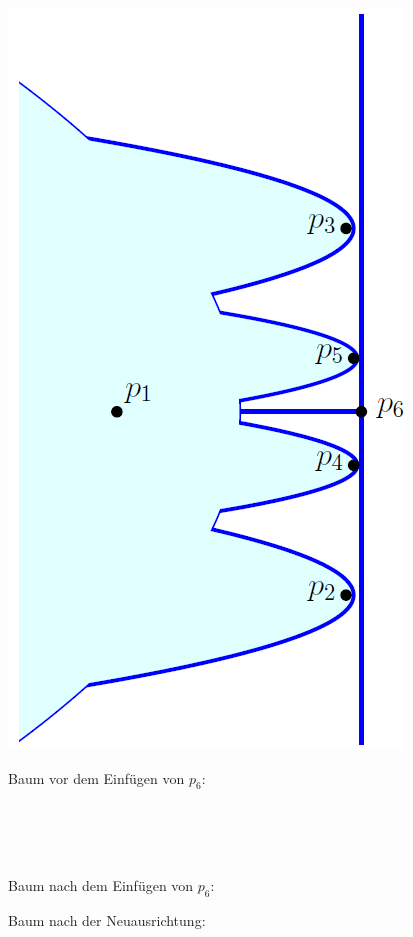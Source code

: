 \begin{itemize}
\begin{description}
\begin{description}
{\begin{minipage}{0.2\textwidth}
							\includegraphics[scale=0.25]{Pics/8_beachline-tree.png}
						\end{minipage}
						\hfill
						\begin{minipage}{0.75\textwidth}
						Baum vor dem Einfügen von $p_6$:\\
						\resizebox{0.7\textwidth}{!}{
							}
						\end{minipage}\\\\\\
						\begin{minipage}{0.4\textwidth}
						Baum nach dem Einfügen von $p_6$:
						\end{minipage}
						\hfill
						\begin{minipage}{0.5\textwidth}
						Baum nach der Neuausrichtung:

\end{minipage}}
\end{description}
\end{description}
\end{itemize}
